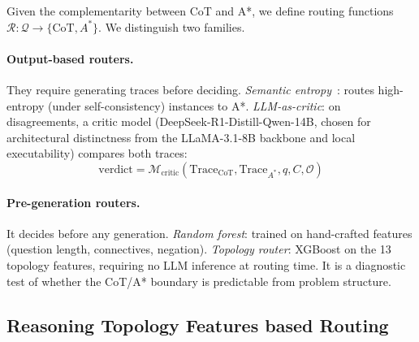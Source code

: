 \documentclass[11pt]{article}
\begin{document}
Given the complementarity between CoT and A*, we define routing functions $\mathcal{R}: \mathcal{Q} \to \{\text{CoT}, A^*\}$. We distinguish two families.

\paragraph{Output-based routers.} They require generating traces before deciding. \emph{Semantic entropy}~\citep{kossen2024semanticentropyprobesrobust}: routes high-entropy (under self-consistency) instances to A*. \emph{LLM-as-critic}: on disagreements, a critic model (DeepSeek-R1-Distill-Qwen-14B, chosen for architectural distinctness from the LLaMA-3.1-8B backbone and local executability) compares both traces:
\begin{equation}
\text{verdict} = \mathcal{M}_{\text{critic}}(\text{Trace}_{\text{CoT}}, \text{Trace}_{A^*}, q, C, \mathcal{O})
\label{eq:critic}
\end{equation}

\paragraph{Pre-generation routers.} It decides before any generation. \emph{Random forest}: trained on hand-crafted features (question length, connectives, negation). \emph{Topology router}: XGBoost on the 13 topology features, requiring no LLM inference at routing time. It is a diagnostic test of whether the CoT/A* boundary is predictable from problem structure.


\subsection{Reasoning Topology Features based Routing}
\label{sec:topology_features}

\end{document}

